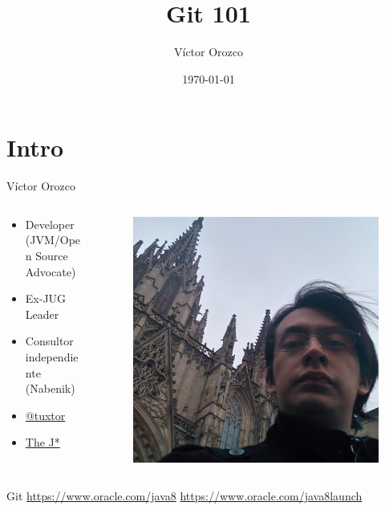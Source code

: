 \documentclass{beamer}
\title{Git 101}
\author{Víctor Orozco}
\institute{GuateJUG}
\date{\today}
\begin{document}
\frame{\titlepage}

\section{Intro}


\begin{frame}{Víctor Orozco}
     \begin{columns}[T] %
	     \begin{column}[T]{5cm} %
				\begin{itemize}
				\item Developer (JVM/Open Source Advocate)
				\item Ex-JUG Leader
				\item Consultor independiente (Nabenik)
				\item \href{https://twitter.com/tuxtor}{@tuxtor}
				\item \href{http://vorozco.com}{The J*} 
				\end{itemize}
	     \end{column}
	     \begin{column}[T]{5cm} %
			\begin{figure}
			\centering
			\includegraphics[width=0.7\linewidth]{Images/barcelona.jpg}
			\end{figure}

	     \end{column}
     \end{columns}
\end{frame}


\begin{frame}{Git}
\href{https://www.oracle.com/java8}{https://www.oracle.com/java8}
\href{https://www.oracle.com/java8launch}{https://www.oracle.com/java8launch}
\end{frame}
\end{document}
